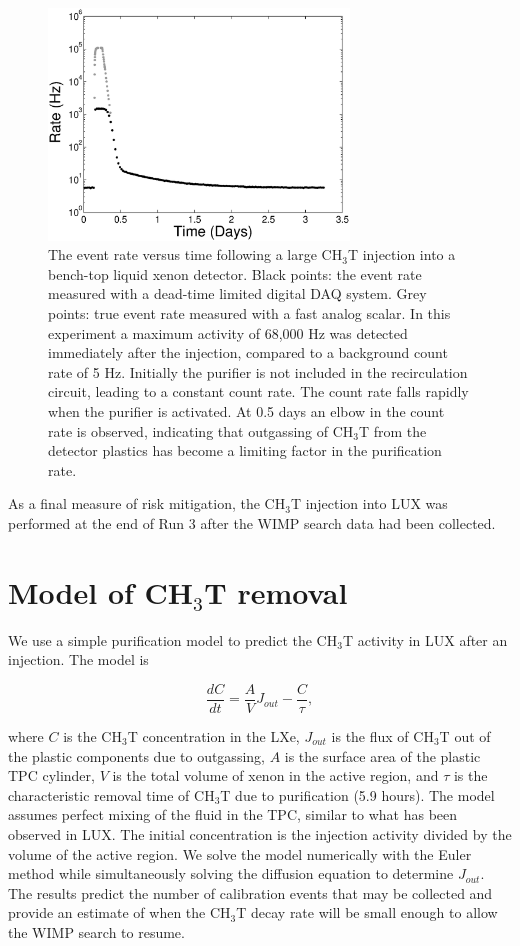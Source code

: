 \begin{figure}[h!]
\includegraphics[width=80mm]{fig/TimeHisto_Analog2.eps}
\caption{The event rate versus time following a large CH$_3$T injection into a bench-top liquid xenon detector. Black points: the event rate measured with a dead-time limited digital DAQ system. Grey points: true event rate measured with a fast analog scalar. In this experiment a maximum activity of 68,000 Hz was detected immediately after the injection, compared to a background count rate of 5 Hz. Initially the purifier is not included in the recirculation circuit, leading to a constant count rate. The count rate falls rapidly when the purifier is activated. At 0.5 days an elbow in the count rate is observed, indicating that outgassing of CH$_3$T from the detector plastics has become a limiting factor in the purification rate. }
\label{fig:Density}
\end{figure}

As a final measure of risk mitigation, the CH$_3$T injection into LUX was performed at the end of Run 3 after the WIMP search data had been collected.

\section{Model of CH$_3$T removal}
\label{sec:appendix2}

We use a simple purification model to predict the CH$_3$T activity in LUX after an injection. The model is 

\begin{equation}
\frac{dC}{dt} = \frac{A}{V}J_{out} -\frac{C}{\tau},
\end{equation}

\noindent where  $C$ is the CH$_3$T concentration in the LXe,  $J_{out}$ is the flux of CH$_3$T out of the plastic components due to outgassing,  $A$ is the surface area of the plastic TPC cylinder, $V$ is the total volume of xenon in the active region, and $\tau$ is the characteristic removal time of CH$_3$T due to purification (5.9 hours). The model assumes perfect mixing of the fluid in the TPC, similar to what has been observed in LUX. The initial concentration is the injection activity divided by the volume of the active region. We solve the model numerically with the Euler method while simultaneously solving the diffusion equation to determine $J_{out}$. The results predict the number of calibration events that may be collected and provide an estimate of when the CH$_3$T  decay rate will be small enough to allow the WIMP search to resume.


